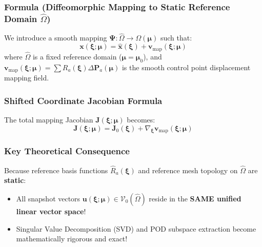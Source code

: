\subsubsection{Formula (Diffeomorphic Mapping to Static Reference Domain $\hat{\Omega}$)}
We introduce a smooth mapping $\boldsymbol{\Psi}: \hat{\Omega} \to \Omega(\boldsymbol{\mu})$ such that:
\begin{equation}
\mathbf{x}(\boldsymbol{\xi}; \boldsymbol{\mu}) = \hat{\mathbf{x}}(\boldsymbol{\xi}) + \mathbf{v}_{\text{map}}(\boldsymbol{\xi}; \boldsymbol{\mu})
\end{equation}
where $\hat{\Omega}$ is a fixed reference domain ($\boldsymbol{\mu} = \boldsymbol{\mu}_0$), and $\mathbf{v}_{\text{map}}(\boldsymbol{\xi}; \boldsymbol{\mu}) = \sum R_a(\boldsymbol{\xi}) \Delta \mathbf{P}_a(\boldsymbol{\mu})$ is the smooth control point displacement mapping field.

\subsubsection{Shifted Coordinate Jacobian Formula}
The total mapping Jacobian $\mathbf{J}(\boldsymbol{\xi}; \boldsymbol{\mu})$ becomes:
\begin{equation}
\mathbf{J}(\boldsymbol{\xi}; \boldsymbol{\mu}) = \mathbf{J}_0(\boldsymbol{\xi}) + \nabla_{\boldsymbol{\xi}} \mathbf{v}_{\text{map}}(\boldsymbol{\xi}; \boldsymbol{\mu})
\end{equation}

\subsubsection{Key Theoretical Consequence}
Because reference basis functions $\hat{R}_a(\boldsymbol{\xi})$ and reference mesh topology on $\hat{\Omega}$ are \textbf{static}:
\begin{itemize}
    \item All snapshot vectors $\mathbf{u}(\boldsymbol{\xi}; \boldsymbol{\mu}) \in \mathcal{V}_0(\hat{\Omega})$ reside in the \textbf{SAME unified linear vector space}!
    \item Singular Value Decomposition (SVD) and POD subspace extraction become mathematically rigorous and exact!
\end{itemize}
